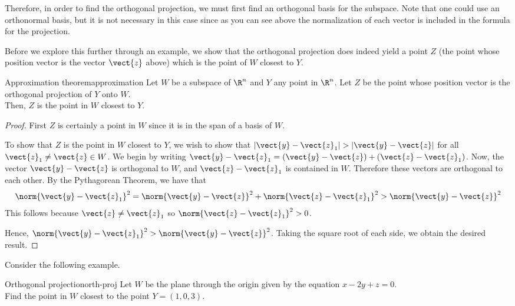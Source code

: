 Therefore, in order to find the orthogonal projection, we must first
find an orthogonal basis for the subspace. Note that one could use an
orthonormal basis, but it is not necessary in this case since as you
can see above the normalization of each vector is included in the
formula for the projection.

Before we explore this further through an example, we show that the
orthogonal projection does indeed yield a point $Z$ (the point whose position
vector is the vector $\vect{z}$ above) which is the point of $W$
closest to $Y$.

\begin{theorem}{Approximation theorem}{approximation}
Let $W$ be a subspace of $\R^n$ and $Y$ any point in
$\R^n$. Let $Z$ be the point whose position vector is the
orthogonal projection of $Y$ onto $W$. \\
Then, $Z$ is the point in $W$ closest to $Y$.
\end{theorem}

\begin{proof}
First $Z$ is certainly a point in $W$  since it is in the span of a basis of $W$.

To show that $Z$ is the point in $W$ closest to $Y$, we wish to show
that $|\vect{y}-\vect{z}_1| > |\vect{y}-\vect{z}|$ for all $\vect{z}_1
\neq \vect{z} \in W$.  We begin by writing $\vect{y}-\vect{z}_1 =
(\vect{y} - \vect{z}) + (\vect{z} -
\vect{z}_1)$.  Now, the vector $\vect{y} - \vect{z}$ is orthogonal to
$W$, and $\vect{z} - \vect{z}_1$ is contained in $W$. Therefore these
vectors are orthogonal to each other. By the Pythagorean Theorem, we
have that
\[
\norm{\vect{y} - \vect{z}_1}^2 = \norm{\vect{y} - \vect{z}} ^2 + \norm{\vect{z} -\vect{z}_1} ^2 > \norm{\vect{y} - \vect{z}}^2
\]
This follows because $\vect{z} \neq \vect{z}_1$ so
$\norm{\vect{z} -\vect{z}_1}^2 > 0$.

Hence, $\norm{\vect{y} - \vect{z}_1}^2 > \norm{
\vect{y} - \vect{z}}^2$. Taking the square root of each
side, we obtain the desired result.
\end{proof}

Consider the following example.

\begin{example}{Orthogonal projection}{orth-proj}
Let $W$ be the plane through the origin given by the equation $x - 2y
+ z = 0$. \\
Find the point in $W$ closest to the point $Y = (1,0,3)$.
\end{example}

